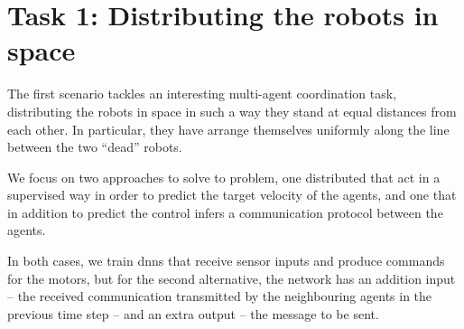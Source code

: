 \section{Task 1: Distributing the robots in space}
\label{sec:task1}

The first scenario tackles an interesting multi-agent coordination task, 
distributing the robots in space in such a way they stand at equal distances 
from each other. In particular, they have arrange themselves uniformly along the 
line between the two ``dead'' robots.

We focus on two approaches to solve to problem, one distributed that act in a 
supervised way in order to predict the target velocity of the agents, and one that 
in addition to predict the control infers a communication protocol between the 
agents. 

In both cases, we train \glspl{dnn} that receive sensor inputs and produce 
commands for the motors, but for the second alternative, the network has an 
addition input – the received communication transmitted by the neighbouring 
agents in the previous time step – and an extra output – the message to be sent.




